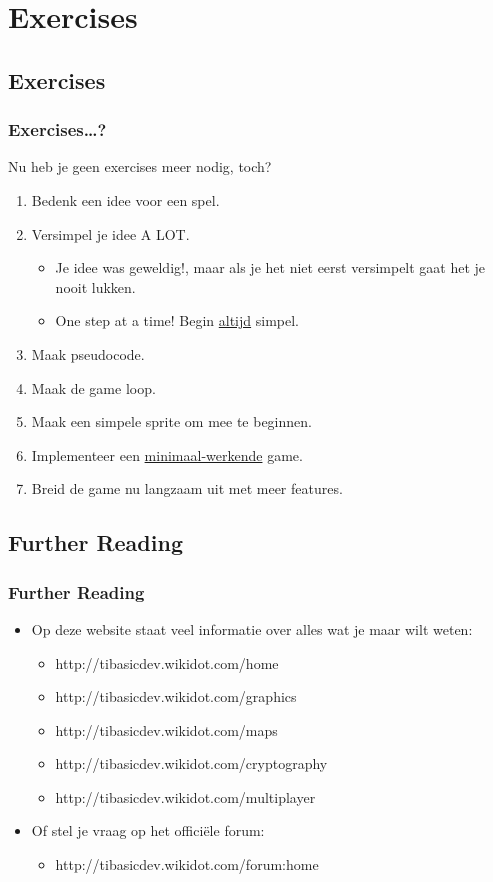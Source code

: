 \section{Exercises}
\subsection{Exercises}
% 
% 
\begin{frame}
\frametitle{Exercises\ldots?}

Nu heb je geen exercises meer nodig, toch?

\begin{enumerate}
  \item Bedenk een idee voor een spel.
  \item Versimpel je idee A LOT.
  \begin{itemize}
    \item Je idee was geweldig!, maar als je het niet eerst versimpelt gaat het je nooit lukken.
    \item One step at a time! Begin \underline{altijd} simpel.
  \end{itemize}
  \item Maak pseudocode.
  \item Maak de game loop.
  \item Maak een simpele sprite om mee te beginnen.
  \item Implementeer een \underline{minimaal-werkende} game.
  \item Breid de game nu langzaam uit met meer features.
\end{enumerate}

\end{frame}




\subsection{Further Reading}

\begin{frame}
\frametitle{Further Reading}

\begin{itemize}
  \item Op deze website staat veel informatie over alles wat je maar wilt weten:
  \begin{itemize}
    \item http://tibasicdev.wikidot.com/home
    \item http://tibasicdev.wikidot.com/graphics
    \item http://tibasicdev.wikidot.com/maps
    \item http://tibasicdev.wikidot.com/cryptography
    \item http://tibasicdev.wikidot.com/multiplayer
  \end{itemize}
  \item Of stel je vraag op het offici\"ele forum:
  \begin{itemize}
    \item http://tibasicdev.wikidot.com/forum:home
  \end{itemize}
\end{itemize}

\end{frame}
